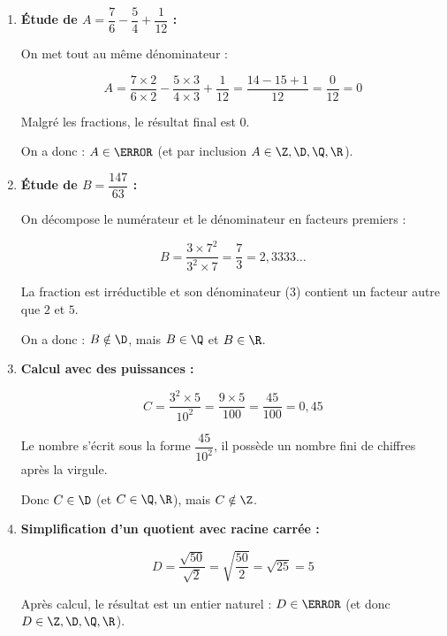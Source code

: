 \begin{ex}
	\nline
	\begin{enumerate}
		\item \textbf{Étude de $A = \dfrac{7}{6} - \dfrac{5}{4} + \dfrac{1}{12}$ :}

		      On met tout au même dénominateur :

		      \[
			      A = \frac{7 \times 2}{6 \times 2} - \frac{5 \times 3}{4 \times 3} + \frac{1}{12} = \frac{14 - 15 + 1}{12} = \frac{0}{12} = 0
		      \]

		      Malgré les fractions, le résultat final est $0$.

		      On a donc : $A \in \N$ (et par inclusion $A \in \Z, \D, \Q, \R$).

		\item \textbf{Étude de $B = \dfrac{147}{63}$ :}

		      On décompose le numérateur et le dénominateur en facteurs premiers :

		      \[
			      B = \frac{3 \times 7^2}{3^2 \times 7} = \frac{7}{3} = 2{,}3333\dots
		      \]

		      La fraction est irréductible et son dénominateur ($3$) contient un facteur autre que $2$ et $5$.

		      On a donc : $B \notin \D$, mais $B \in \Q$ et $B \in \R$.

		\item \textbf{Calcul avec des puissances :}

		      \[
			      C = \frac{3^2 \times 5}{10^2} = \frac{9 \times 5}{100} = \frac{45}{100} = 0{,}45
		      \]

		      Le nombre s'écrit sous la forme $\dfrac{45}{10^2}$, il possède un nombre fini de chiffres après la virgule.

		      Donc $C \in \D$ (et $C \in \Q, \R$), mais $C \notin \Z$.

		\item \textbf{Simplification d'un quotient avec racine carrée :}

		      \[
			      D = \frac{\sqrt{50}}{\sqrt{2}} = \sqrt{\frac{50}{2}} = \sqrt{25} = 5
		      \]

		      Après calcul, le résultat est un entier naturel : $D \in \N$ (et donc $D \in \Z, \D, \Q, \R$).

	\end{enumerate}
\end{ex}

